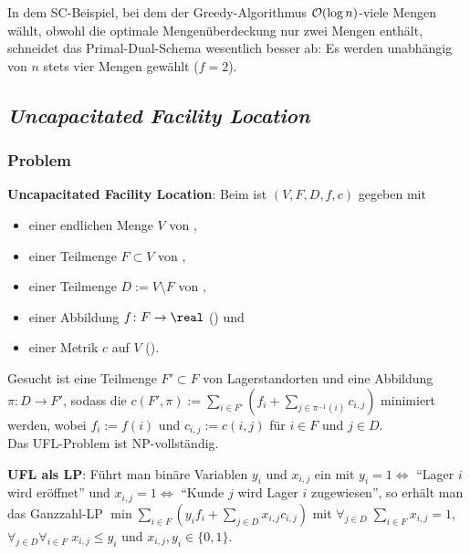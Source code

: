 \linie

In dem SC-Beispiel, bei dem der Greedy-Algorithmus $\mathcal{O}(\log n)$-viele Mengen wählt,
obwohl die optimale Mengenüberdeckung nur zwei Mengen enthält,
schneidet das Primal-Dual-Schema wesentlich besser ab:
Es werden unabhängig von $n$ stets vier Mengen gewählt
($f = 2$).

\pagebreak

\subsection{%
    \emph{Uncapacitated Facility Location}%
}

\subsubsection{%
    Problem%
}

\textbf{Uncapacitated Facility Location}:
Beim  ist $(V, F, D, f, c)$ gegeben mit
\begin{itemize}
    \item
    einer endlichen Menge $V$ von ,
    
    \item
    einer Teilmenge $F \subset V$ von ,
    
    \item
    einer Teilmenge $D := V \setminus F$ von ,
    
    \item
    einer Abbildung $f\colon F \to \real$ () und
    
    \item
    einer Metrik $c$ auf $V$ ().
\end{itemize}
Gesucht ist eine Teilmenge $F' \subset F$ von Lagerstandorten und eine Abbildung
$\pi\colon D \to F'$, sodass die 
$c(F', \pi) := \sum_{i \in F'} (f_i + \sum_{j \in \pi^{-1}(i)} c_{i,j})$ minimiert werden,
wobei $f_i := f(i)$ und $c_{i,j} := c(i, j)$ für $i \in F$ und $j \in D$.\\
Das UFL-Problem ist NP-vollständig.

\linie

\textbf{UFL als LP}:
Führt man binäre Variablen $y_i$ und $x_{i,j}$ ein mit
$y_i = 1 \iff$ "`Lager $i$ wird eröffnet"' und
$x_{i,j} = 1 \iff$ "`Kunde $j$ wird Lager $i$ zugewiesen"',
so erhält man das Ganzzahl-LP
$\min \sum_{i \in F} (y_i f_i + \sum_{j \in D} x_{i,j} c_{i,j})$ mit
$\forall_{j \in D}\; \sum_{i \in F} x_{i,j} = 1$,
$\forall_{j \in D} \forall_{i \in F}\; x_{i,j} \le y_i$ und
$x_{i,j}, y_i \in \{0, 1\}$.

